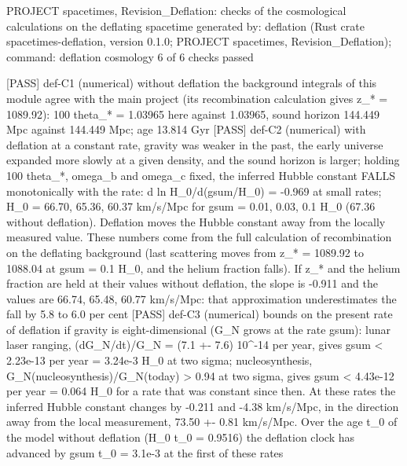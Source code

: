 \documentclass[
  10pt,
]{article}
\newenvironment{Shaded}{}{}
\newcommand{\NormalTok}[1]{#1}
\begin{document}
\begin{Shaded}
\begin{Highlighting}[]
\NormalTok{PROJECT spacetimes, Revision\_Deflation: checks of the cosmological calculations on the deflating spacetime}
\NormalTok{generated by: deflation (Rust crate spacetimes{-}deflation, version 0.1.0; PROJECT spacetimes, Revision\_Deflation); command: deflation cosmology}
\NormalTok{6 of 6 checks passed}

\NormalTok{[PASS] def{-}C1  (numerical) without deflation the background integrals of this module agree with the main project (its recombination calculation gives z\_* = 1089.92): 100 theta\_* = 1.03965 here against 1.03965, sound horizon 144.449 Mpc against 144.449 Mpc; age 13.814 Gyr}
\NormalTok{[PASS] def{-}C2  (numerical) with deflation at a constant rate, gravity was weaker in the past, the early universe expanded more slowly at a given density, and the sound horizon is larger; holding 100 theta\_*, omega\_b and omega\_c fixed, the inferred Hubble constant FALLS monotonically with the rate: d ln H\_0/d(gsum/H\_0) = {-}0.969 at small rates; H\_0 = 66.70, 65.36, 60.37 km/s/Mpc for gsum = 0.01, 0.03, 0.1 H\_0 (67.36 without deflation). Deflation moves the Hubble constant away from the locally measured value. These numbers come from the full calculation of recombination on the deflating background (last scattering moves from z\_* = 1089.92 to 1088.04 at gsum = 0.1 H\_0, and the helium fraction falls). If z\_* and the helium fraction are held at their values without deflation, the slope is {-}0.911 and the values are 66.74, 65.48, 60.77 km/s/Mpc: that approximation underestimates the fall by 5.8 to 6.0 per cent}
\NormalTok{[PASS] def{-}C3  (numerical) bounds on the present rate of deflation if gravity is eight{-}dimensional (G\_N grows at the rate gsum): lunar laser ranging, (dG\_N/dt)/G\_N = (7.1 +{-} 7.6) 10\^{}{-}14 per year, gives gsum \textless{} 2.23e{-}13 per year = 3.24e{-}3 H\_0 at two sigma; nucleosynthesis, G\_N(nucleosynthesis)/G\_N(today) \textgreater{} 0.94 at two sigma, gives gsum \textless{} 4.43e{-}12 per year = 0.064 H\_0 for a rate that was constant since then. At these rates the inferred Hubble constant changes by {-}0.211 and {-}4.38 km/s/Mpc, in the direction away from the local measurement, 73.50 +{-} 0.81 km/s/Mpc. Over the age t\_0 of the model without deflation (H\_0 t\_0 = 0.9516) the deflation clock has advanced by gsum t\_0 = 3.1e{-}3 at the first of these rates}

\end{Highlighting}
\end{Shaded}
\end{document}
